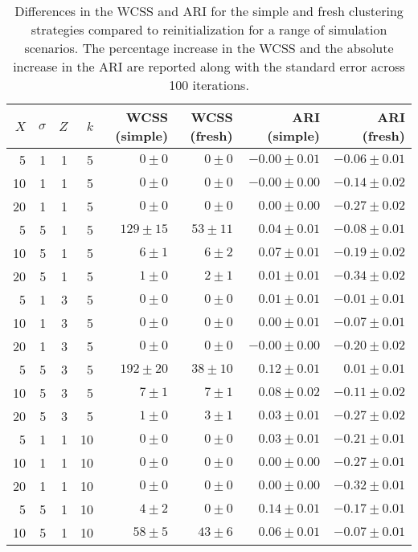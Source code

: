 \documentclass{article}
\begin{document}
\begin{table}
\caption{Differences in the WCSS and ARI for the simple and fresh clustering strategies compared to reinitialization for a range of simulation scenarios.
The percentage increase in the WCSS and the absolute increase in the ARI are reported along with the standard error across 100 iterations.}
\label{tab:holdout-subpop}
\begin{center}
\begin{tabular}{r r r r r r r r}
\hline
$X$ & $\sigma$ & $Z$ & $k$ & WCSS (simple) & WCSS (fresh) & ARI (simple) & ARI (fresh) \\
\hline
5 & 1 & 1 & 5 & $0 \pm 0$ & $0 \pm 0$ & $-0.00 \pm 0.01$ & $-0.06 \pm 0.01$ \\
10 & 1 & 1 & 5 & $0 \pm 0$ & $0 \pm 0$ & $-0.00 \pm 0.00$ & $-0.14 \pm 0.02$ \\
20 & 1 & 1 & 5 & $0 \pm 0$ & $0 \pm 0$ & $0.00 \pm 0.00$ & $-0.27 \pm 0.02$ \\
5 & 5 & 1 & 5 & $129 \pm 15$ & $53 \pm 11$ & $0.04 \pm 0.01$ & $-0.08 \pm 0.01$ \\
10 & 5 & 1 & 5 & $6 \pm 1$ & $6 \pm 2$ & $0.07 \pm 0.01$ & $-0.19 \pm 0.02$ \\
20 & 5 & 1 & 5 & $1 \pm 0$ & $2 \pm 1$ & $0.01 \pm 0.01$ & $-0.34 \pm 0.02$ \\
5 & 1 & 3 & 5 & $0 \pm 0$ & $0 \pm 0$ & $0.01 \pm 0.01$ & $-0.01 \pm 0.01$ \\
10 & 1 & 3 & 5 & $0 \pm 0$ & $0 \pm 0$ & $0.00 \pm 0.01$ & $-0.07 \pm 0.01$ \\
20 & 1 & 3 & 5 & $0 \pm 0$ & $0 \pm 0$ & $-0.00 \pm 0.00$ & $-0.20 \pm 0.02$ \\
5 & 5 & 3 & 5 & $192 \pm 20$ & $38 \pm 10$ & $0.12 \pm 0.01$ & $0.01 \pm 0.01$ \\
10 & 5 & 3 & 5 & $7 \pm 1$ & $7 \pm 1$ & $0.08 \pm 0.02$ & $-0.11 \pm 0.02$ \\
20 & 5 & 3 & 5 & $1 \pm 0$ & $3 \pm 1$ & $0.03 \pm 0.01$ & $-0.27 \pm 0.02$ \\
5 & 1 & 1 & 10 & $0 \pm 0$ & $0 \pm 0$ & $0.03 \pm 0.01$ & $-0.21 \pm 0.01$ \\
10 & 1 & 1 & 10 & $0 \pm 0$ & $0 \pm 0$ & $0.00 \pm 0.00$ & $-0.27 \pm 0.01$ \\
20 & 1 & 1 & 10 & $0 \pm 0$ & $0 \pm 0$ & $0.00 \pm 0.00$ & $-0.32 \pm 0.01$ \\
5 & 5 & 1 & 10 & $4 \pm 2$ & $0 \pm 0$ & $0.14 \pm 0.01$ & $-0.17 \pm 0.01$ \\
10 & 5 & 1 & 10 & $58 \pm 5$ & $43 \pm 6$ & $0.06 \pm 0.01$ & $-0.07 \pm 0.01$ \\

\end{tabular}
\end{center}
\end{table}
\end{document}
